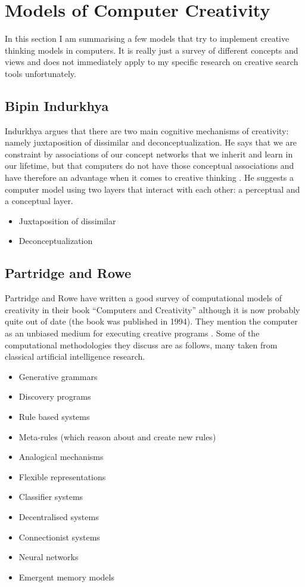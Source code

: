 \section{Models of Computer Creativity}

In this section I am summarising a few models that try to implement creative thinking models in computers. It is really just a survey of different concepts and views and does not immediately apply to my specific research on creative search tools unfortunately.

\subsection{Bipin Indurkhya}

Indurkhya argues that there are two main cognitive mechanisms of creativity: namely juxtaposition of dissimilar and deconceptualization. He says that we are constraint by associations of our concept networks that we inherit and learn in our lifetime, but that computers do not have those conceptual associations and have therefore an advantage when it comes to creative thinking \citep{Indurkhya}. He suggests a computer model using two layers that interact with each other: a perceptual and a conceptual layer.

\begin{itemize}
  \item Juxtaposition of dissimilar
  \item Deconceptualization
\end{itemize}

\subsection{Partridge and Rowe}

Partridge and Rowe have written a good survey of computational models of creativity in their book ``Computers and Creativity'' \citep{Partridge1994} although it is now probably quite out of date (the book was published in 1994). They mention the computer as an unbiased medium for executing creative programs \citep[p.26]{Partridge1994}. Some of the computational methodologies they discuss are as follows, many taken from classical artificial intelligence research.

\begin{itemize}
  \item Generative  grammars
  \item Discovery programs
  \item Rule based systems
  \item Meta-rules (which reason about and create new rules)
  \item Analogical mechanisms
  \item Flexible representations
  \item Classifier systems
  \item Decentralised systems
  \item Connectionist systems
  \item Neural networks
  \item Emergent memory models
\end{itemize}

